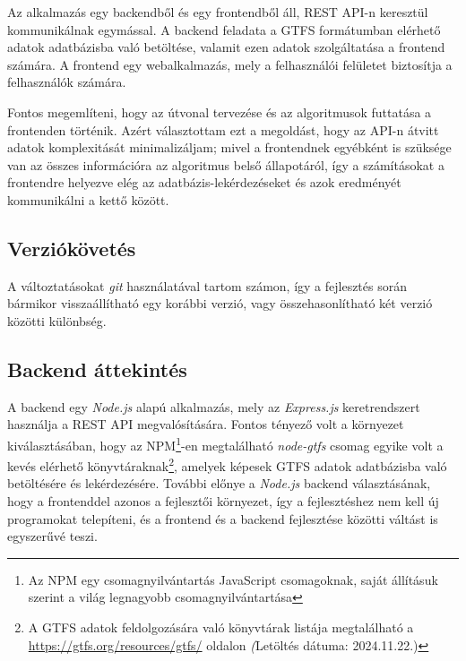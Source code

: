Az alkalmazás egy backendből és egy frontendből áll, REST API-n keresztül kommunikálnak egymással. A backend feladata a GTFS formátumban elérhető adatok adatbázisba való betöltése, valamit ezen adatok szolgáltatása a frontend számára. A frontend egy webalkalmazás, mely a felhasználói felületet biztosítja a felhasználók számára.

Fontos megemlíteni, hogy az útvonal tervezése és az algoritmusok futtatása a frontenden történik. Azért választottam ezt a megoldást, hogy az API-n átvitt adatok komplexitását minimalizáljam; mivel a frontendnek egyébként is szüksége van az összes információra az algoritmus belső állapotáról, így a számításokat a frontendre helyezve elég az adatbázis-lekérdezéseket és azok eredményét kommunikálni a kettő között.

\subsection{Verziókövetés}

A változtatásokat \textit{git} használatával tartom számon, így a fejlesztés során bármikor visszaállítható egy korábbi verzió, vagy összehasonlítható két verzió közötti különbség.

\subsection{Backend áttekintés}

A backend egy \textit{Node.js} alapú alkalmazás, mely az \textit{Express.js} keretrendszert használja a REST API megvalósítására. Fontos tényező volt a környezet kiválasztásában, hogy az NPM\footnote{Az NPM egy csomagnyilvántartás JavaScript csomagoknak, saját állításuk szerint a világ legnagyobb csomagnyilvántartása\cite{nodeabout}}-en megtalálható \textit{node-gtfs}\cite{nodegtfs} csomag egyike volt a kevés elérhető könyvtáraknak\footnote{A GTFS adatok feldolgozására való könyvtárak listája megtalálható a \url{https://gtfs.org/resources/gtfs/} oldalon \textit(Letöltés dátuma: 2024.11.22.)}, amelyek képesek GTFS adatok adatbázisba való betöltésére és lekérdezésére. További előnye a \textit{Node.js} backend választásának, hogy a frontenddel azonos a fejlesztői környezet, így a fejlesztéshez nem kell új programokat telepíteni, és a frontend és a backend fejlesztése közötti váltást is egyszerűvé teszi.

